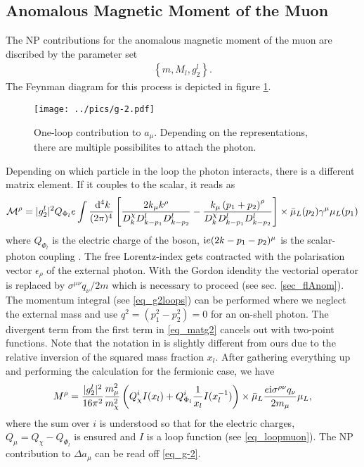 \subsection{Anomalous Magnetic Moment of the Muon}
The NP contributions for the anomalous magnetic moment of the muon are discribed by the parameter set 
\begin{align}
 \left\{m, M_l, g_2^l\right\}.
\end{align}
The Feynman diagram for this process is depicted in figure \ref{pic_g-2}. 
\begin{figure}[t]
 \texttt{[image: ../pics/g-2.pdf]}
 \caption{One-loop contribution to $a_\mu$. Depending on the representations, there are multiple possibilites to attach the photon.}
 \label{pic_g-2}
\end{figure}
Depending on which particle in the loop the photon interacts, there is a different matrix element. If it couples to the scalar, it reads as
\begin{align}
 \mathcal{M}^\rho = |g_2^l|^2 Q_{\Phi_l} e \int\frac{\; \mathrm{d}^4 k}{(2\pi)^4} \left[ \frac{2k_\mu k^\rho}{D^\chi_kD^l_{k-p_1}D^l_{k-p_2}} - \frac{k_\mu\left(p_1 +p_2\right)^\rho}{D^\chi_kD^l_{k-p_1}D^l_{k-p_2}} \right]\times \bar\mu_L(p_2)\gamma^\mu\mu_L(p_1) 
 \label{eq_matg2}
\end{align}
where $Q_{\Phi_l}$ is the electric charge of the boson, $\text{i} e(2k-p_1-p_2)^\mu$ is the scalar-photon coupling \cite{MDSchwartz}. 
The free Lorentz-index gets contracted with
the polarisation vector $\epsilon_\rho$ of the external photon. With the Gordon idendity the vectorial operator is replaced by 
$\sigma^{\mu\nu}q_\nu/2m$ which is necessary to proceed (see sec. \ref{sec_flAnom}). The momentum integral (see \eqref{eq_g2loops})
can be performed \cite{Lavoura} 
where we neglect the external mass and use $q^2=(p_1^2-p_2^2) = 0$ for an on-shell photon. The divergent term from the first term in \eqref{eq_matg2}
cancels out with two-point functions. 
Note that the notation in \cite{Lavoura} is slightly different from ours due to the relative inversion of the squared mass 
fraction $x_l$. 
After gathering everything up and performing the calculation for the fermionic case, we have
\begin{align}
 M^\rho = \frac{|g^l_2|^2}{16\pi^2} \frac{m^2_\mu}{m_\chi^2}\left(Q_\chi^i I(x_l) + Q_{\Phi_l}^i \frac{1}{x_l} I(x_l^{-1}) \right)\times \bar \mu_L\frac{e\text{i}\sigma^{\rho\nu}q_\nu}{2m_\mu} \mu_L,
 \label{eq_g-2}
\end{align}
where the sum over $i$ is understood so that for the electric charges, $Q_\mu = Q_\chi - Q_{\Phi_l}$ is ensured and $I$ is a loop function 
(see \eqref{eq_loopmuon}). The NP contribution to $\Delta a_\mu$ can be read off \eqref{eq_g-2}.
